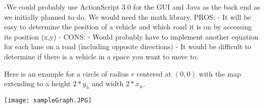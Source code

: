 \documentclass[a4paper]{article}
\begin{document}
\vspace{.5cm}
\noindent-We could probably use ActionScript 3.0 for the GUI and Java as the back end as we initially planned to do. We would need the math library.
\vspace{.5cm}\newline PROS: 
\newline - It will be easy to determine the position of a vehicle and which road it is on by accessing its position (x,y) 
\newline - 
\newline CONS:
\newline - Would probably have to implement another equation for each lane on a road (including opposite directions)
\newline - It would be difficult to determine if there is a vehicle in a space you want to move to.

\vspace{.5cm}
Here is an example for a circle of radius $r$ centered at $(0,0)$ with the map extending to a height $2*y_h$ and width $2*x_w$.

\begin{center}
\texttt{[image: sampleGraph.JPG]}
\end{center}
\end{document}
